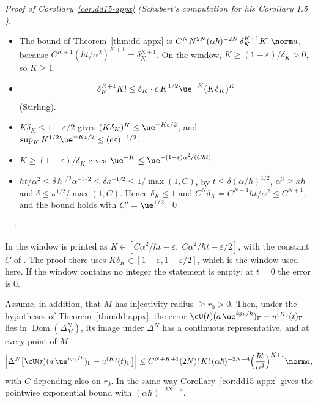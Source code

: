 \begin{proof}[Proof of Corollary~\ref{cor:dd15-appx} (Schubert's computation for his Corollary 1.5 \cite{S})]
\begin{itemize}
\item The bound of Theorem~\ref{thm:dd-appx} is $C^NN^{2N}(\alpha\hbar)^{-2N}\,\delta_K^{K+1}K!\,\norm a$, because $C^{K+1}(\hbar t/\alpha^2)^{K+1}=\delta_K^{K+1}$.
On the window, $K\ge(1-\varepsilon)/\delta_K>0$, so $K\ge1$.
\item \[\delta_K^{K+1}K!\le\delta_K\cdot e\,K^{1/2}\ue^{-K}(K\delta_K)^K\] (Stirling).
\item $K\delta_K\le1-\varepsilon/2$ gives $(K\delta_K)^K\le\ue^{-K\varepsilon/2}$, and $\sup_KK^{1/2}\ue^{-K\varepsilon/2}\le(e\varepsilon)^{-1/2}$.
\item $K\ge(1-\varepsilon)/\delta_K$ gives $\ue^{-K}\le\ue^{-(1-\varepsilon)\alpha^2/(C\hbar t)}$.
\item $\hbar t/\alpha^2\le\delta\,\hbar^{1/2}\alpha^{-3/2}\le\delta\kappa^{-1/2}\le1/\max(1,C)$, by $t\le\delta(\alpha/\hbar)^{1/2}$, $\alpha^3\ge\kappa\hbar$ and
$\delta\le\kappa^{1/2}/\max(1,C)$. Hence $\delta_K\le1$ and $C^N\delta_K=C^{N+1}\hbar t/\alpha^2\le C^{N+1}$, and the bound holds with $C'=\ue^{1/2}$. \qed
\end{itemize}
\end{proof}

\begin{remark}
In \cite[Corollary~1.5]{S} the window is printed as $K\in[C\alpha^2/\hbar t-\varepsilon,\;C\alpha^2/\hbar t-\varepsilon/2]$, with the constant $C$ of
\cite[(1.30)]{S}. The proof there uses $K\delta_K\in[1-\varepsilon,1-\varepsilon/2]$, which is the window used here. If the window contains no integer
the statement is empty; at $t=0$ the error is $0$.
\end{remark}

\begin{corollary}\label{cor:dd16-appx}
Assume, in addition, that $M$ has injectivity radius $\ge r_0>0$. Then, under the hypotheses of Theorem~\ref{thm:dd-appx}, the error
$\cU(t)(a\,\ue^{i\varphi_b/\hbar})_\Gamma-u^{(K)}(t)_\Gamma$ lies in $\operatorname{Dom}(\Delta_M^N)$, its image under $\Delta^N$ has a continuous
representative, and at every point of $M$
\[
\Bigl|\Delta^N\bigl[\cU(t)(a\,\ue^{i\varphi_b/\hbar})_\Gamma-u^{(K)}(t)_\Gamma\bigr]\Bigr|\le C^{N+K+1}(2N)!\,K!\,(\alpha\hbar)^{-2N-4}\Bigl(\frac{\hbar t}{\alpha^2}\Bigr)^{K+1}\norm a,
\]
with $C$ depending also on $r_0$. In the same way Corollary~\ref{cor:dd15-appx} gives the pointwise exponential bound with $(\alpha\hbar)^{-2N-4}$.
\end{corollary}

